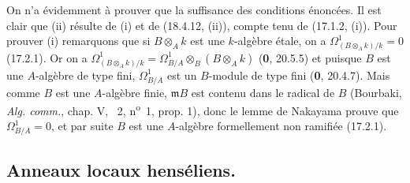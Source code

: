 On n'a évidemment à prouver que la suffisance des conditions énoncées. Il est clair que (ii) résulte de (i) et de (18.4.12, (ii)), compte tenu de (17.1.2, (i)). Pour prouver (i) remarquons que si $B\otimes_A k$ est une $k$-algèbre étale, on a $\Omega^1_{(B\otimes_A k)/k}=0$ (17.2.1). Or on a $\Omega^1_{(B\otimes_A k)/k}=\Omega^1_{B/A}\otimes_B(B\otimes_A k)$ (\textbf{0}, 20.5.5) et puisque $B$ est une $A$-algèbre de type fini, $\Omega^1_{B/A}$ est un $B$-module de type fini (\textbf{0}, 20.4.7). Mais comme $B$ est une $A$-algèbre finie, $\mathfrak mB$ est contenu dans le radical de $B$ (Bourbaki, \emph{Alg. comm.}, chap. V, \textsection~2, n\textsuperscript{o}~1, prop. 1), donc le lemme de Nakayama prouve que $\Omega^1_{B/A}=0$, et par suite $B$ est une $A$-algèbre formellement non ramifiée (17.2.1).

\subsection{Anneaux locaux henséliens\texorpdfstring{\protect\footnotemark}{}.}

